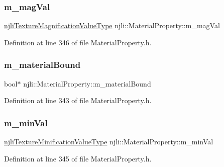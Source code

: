 \subsubsection{\texorpdfstring{m\+\_\+mag\+Val}{m\_magVal}}
{\footnotesize\ttfamily \mbox{\hyperlink{namespacenjli_a9fe7a080d946c5be3afc71d834dc7902}{njli\+Texture\+Magnification\+Value\+Type}} njli\+::\+Material\+Property\+::m\+\_\+mag\+Val\hspace{0.3cm}{\ttfamily [private]}}



Definition at line 346 of file Material\+Property.\+h.

\mbox{\label{classnjli_1_1_material_property_a792f0aecc3bf0a36018e7abeca5c7080}} 
\subsubsection{\texorpdfstring{m\+\_\+material\+Bound}{m\_materialBound}}
{\footnotesize\ttfamily bool$\ast$ njli\+::\+Material\+Property\+::m\+\_\+material\+Bound\hspace{0.3cm}{\ttfamily [private]}}



Definition at line 343 of file Material\+Property.\+h.

\mbox{\label{classnjli_1_1_material_property_a13b42d54787929d981050557ac4748a8}} 
\subsubsection{\texorpdfstring{m\+\_\+min\+Val}{m\_minVal}}
{\footnotesize\ttfamily \mbox{\hyperlink{namespacenjli_a980b62f11da3b7143a525012cb512bac}{njli\+Texture\+Minification\+Value\+Type}} njli\+::\+Material\+Property\+::m\+\_\+min\+Val\hspace{0.3cm}{\ttfamily [private]}}



Definition at line 345 of file Material\+Property.\+h.

